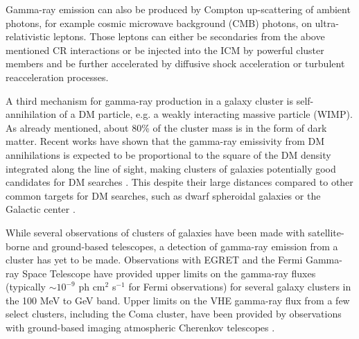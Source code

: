 \documentclass[12pt,manuscript]{aastex}
\begin{document}
Gamma-ray emission can also be produced by Compton up-scattering of ambient photons, for example cosmic microwave background (CMB) photons, on ultra-relativistic leptons. Those leptons can either be secondaries from the above mentioned CR interactions or be injected into the ICM by powerful cluster
members and be further accelerated by diffusive shock acceleration or turbulent reacceleration processes.

A third mechanism for gamma-ray production in a galaxy cluster is self-annihilation of a DM particle, e.g. a weakly interacting massive particle (WIMP). As already mentioned, about 80\% of the cluster mass is in the form of dark matter. Recent works \citep{article:EvansFerrerSarkar:2004, article:BergstromHooper:2006} have shown that the gamma-ray emissivity from DM annihilations is expected to be proportional to the square of the DM density integrated along the line of sight, making clusters of galaxies potentially good
candidates for DM searches \citep{article:PinzkePfrommerBergstrom2009, article:Cuesta_etal:2011}. This despite their large distances compared to other common targets for DM searches, such as dwarf spheroidal galaxies \citep{article:Strigari_etal:2007, article:Acciari_etal:2010,article:Aliu_etal:2009} or the Galactic center \citep{article:Kosack_etal:2004, article:Aharonian_etal:2006, article:Aharonian_etal:2009b}.

While several observations of clusters of galaxies have been made with satellite-borne and ground-based telescopes, a detection of gamma-ray emission from a cluster has yet to be made.  Observations with EGRET
\citep{article:Sreekumar_etal:1996, article:Reimer_etal:2003} and the Fermi Gamma-ray Space Telescope \citep{article:Ackermann_etal:2010} have provided upper limits on the gamma-ray fluxes (typically $\sim10^{-9}$ ph cm$^{2}$ s$^{-1}$ for Fermi observations) for several galaxy clusters in the 100 MeV to GeV
band. Upper limits on the VHE gamma-ray flux from a few select clusters, including the Coma cluster, have been provided by observations with ground-based imaging atmospheric Cherenkov telescopes \citep[IACTs;][]{article:Perkins_etal:2006, inproc:Perkins_etal:2008, article:Aharonian_etal:2009a, article:Aleksic_etal:2010}.
\end{document}
